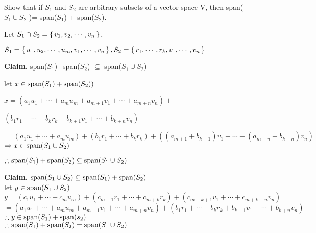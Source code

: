 Show that if $S_1$ and $S_2$ are arbitrary subsets of a vector space $\mathrm{V}$, then span($S_1 \cup S_2$ )= span($S_1$) + span($S_2$).

\begin{tcolorbox}
	\begin{solution}
	
		Let $S_1 \cap S_2 = \left\{ \,v_1,v_2,\cdots , v_n \,\right\}$,
		
		$S_1 = \left\{ \,u_1,u_2,\cdots,u_m,v_1,\cdots,v_n \,\right\} , S_2 = \left\{ \,r_1,\cdots,r_k,v_{1}, \cdots,v_{n} \,\right\}$  
		
		\textbf{Claim.} span($S_1$)+span($S_2$) $\subseteq$ span($S_1 \cup S_2$)
		
		let $x \in \text{span($S_1$)}+\text{span($S_2$)})$
		
		$x = (a_1u_1+ \cdots +a_mu_m+a_{m+1}v_1+\cdots + a_{m+n}v_n) + $
		
		$ (b_1r_1+\cdots+b_kr_k + b_{k+1}v_1 + \cdots + b_{k+n}v_n) $
		
		$=(a_1u_1 + \cdots + a_mu_m)+(b_{1}r_1+ \cdots + b_{k}r_k)+((a_{m+1}+b_{k+1})v_1 + \cdots + (a_{m+n}+b_{k+n})v_n)$
		$\Rightarrow x \in \text{span($S_1 \cup S_2$)}$
		
		$\therefore \text{span($S_1$)} + \text{span($S_2$)} \subseteq \text{span($S_1 \cup S_2$)} $
		
		\textbf{Claim.} $\text{span($S_1 \cup S_2$)} \subseteq \text{span($S_1$)} + \text{span($S_2$)}$\\
		let $y \in \text{span($S_1 \cup S_2$)}$\\
		$y = (c_1u_1 + \cdots + c_mu_m)+(c_{m+1}r_1+ \cdots + c_{m+k}r_k)+(c_{m+k+1}v_1 + \cdots + c_{m+k+n}v_n)$\\
		$= (a_1u_1+ \cdots +a_mu_m+a_{m+1}v_1+\cdots + a_{m+n}v_{n}) + (b_1r_1+\cdots + b_kr_k + b_{k+1}v_1 + \cdots + b_{k+n}v_n)$\\
		$\therefore y \in \text{span($S_1$)} + \text{span($s_2$)}$\\
		$\therefore \text{span($S_1$)} + \text{span($S_2$)} = \text{span($S_1 \cup S_2$)}$
		
	\end{solution}
\end{tcolorbox}